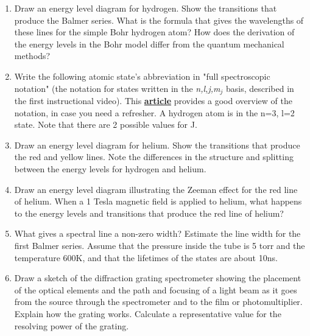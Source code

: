 \documentclass{signatures}
\begin{document}
\maketitle

\names

\prelab

\begin{enumerate}

    \item Draw an energy level diagram for hydrogen. Show the transitions that produce the Balmer series. What is the formula that gives the wavelengths of these lines for the simple Bohr hydrogen atom? How does the derivation of the energy levels in the Bohr model differ from the quantum mechanical methods?
    
    \item Write the following atomic state's abbreviation in "full spectroscopic notation" (the notation for states written in the \emph{n,l,j,m$_j$} basis, described in the first instructional video). This \href{http://www.physics.byu.edu/faculty/bergeson/physics571/notes/L27spectnotation.pdf}{\textbf{article}} provides a good overview of the notation, in case you need a refresher. A hydrogen atom is in the n=3, l=2 state. Note that there are 2 possible values for J. 

    \item Draw an energy level diagram for helium. Show the transitions that produce the red and yellow lines. Note the differences in the structure and splitting between the energy levels for hydrogen and helium.

    \item Draw an energy level diagram illustrating the Zeeman effect for the red line of helium. When a 1 Tesla magnetic field is applied to helium, what happens to the energy levels and transitions that produce the red line of helium?

    \item What gives a spectral line a non-zero width? Estimate the line width for the first Balmer series. Assume that the pressure inside the tube is 5 torr and the temperature 600K, and that the lifetimes of the states are about 10ns.

    \item Draw a sketch of the diffraction grating spectrometer showing the placement of the optical elements and the path and focusing of a light beam as it goes from the source through the spectrometer and to the film or photomultiplier. Explain how the grating works. Calculate a representative value for the resolving power of the grating.


\end{enumerate}
\end{document}

